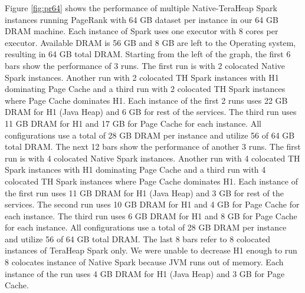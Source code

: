 Figure \ref{fig:pr64} shows the performance of multiple
Native-TeraHeap Spark instances running PageRank with 64 GB
dataset per instance in our 64 GB DRAM machine. Each instance of Spark
uses one executor with 8 cores per executor. Available DRAM is 56 GB
and 8 GB are left to the Operating system, resulting in 64 GB total
DRAM.
Starting from the left of the graph, the first 6 bars show the
performance of 3 runs. The first run is with 2 colocated Native Spark instances.
Another run with 2 colocated TH Spark instances with H1 dominating Page Cache
and a third run with 2 colocated TH Spark instances where Page Cache dominates H1.
Each instance of the first 2 runs uses 22 GB DRAM for H1 (Java Heap) and 6 GB for rest of the services.
The third run uses 11 GB DRAM for H1 and 17 GB for Page Cache for each instance. All configurations use
a total of 28 GB DRAM per instance and utilize 56 of 64 GB total DRAM.
The next 12 bars show the
performance of another 3 runs. The first run is with 4 colocated Native Spark instances.
Another run with 4 colocated TH Spark instances with H1 dominating Page Cache
and a third run with 4 colocated TH Spark instances where Page Cache dominates H1.
Each instance of the first run uses 11 GB DRAM for H1 (Java Heap) and 3 GB for rest of the services.
The second run uses 10 GB DRAM for H1 and 4 GB for Page Cache for each instance.
The third run uses 6 GB DRAM for H1 and 8 GB for Page Cache for each instance.
All configurations use a total of 28 GB DRAM per instance and utilize 56 of 64 GB total DRAM.
The last 8 bars refer to 8 colocated instances of TeraHeap Spark only. 
We were unable to decrease H1 enough to run 8 colocates instance of Native Spark
because JVM runs out of memory. Each instance of the run uses 4 GB DRAM for H1 (Java Heap) and 3 GB for Page Cache.

